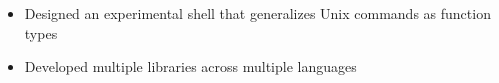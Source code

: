 \begin{itemize}
  \item Designed an experimental shell that generalizes Unix commands as function types
  \item Developed multiple libraries across multiple languages
\end{itemize}
\vspace{4pt}
